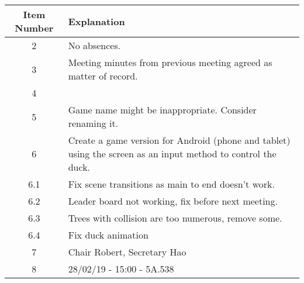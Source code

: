 \documentclass{article}
\begin{document}
\begin{table}[H]
	\centering
	\begin{tabular}{| c | p{9cm} |}
		\hline
		Item Number & Explanation \\ \hline
		2 & No absences.\\ \hline
		3 & Meeting minutes from previous meeting agreed as matter of record. \\ \hline
		4 & \\ \hline
		5 & Game name might be inappropriate. Consider renaming it.\\ \hline
		6 & Create a game version for Android (phone and tablet) using the screen as an input method to control the duck. \\ \hline
		6.1 & Fix scene transitions as main to end doesn't work. \\ \hline
		6.2 & Leader board not working, fix before next meeting. \\ \hline
		6.3 & Trees with collision are too numerous, remove some. \\ \hline
		6.4 & Fix duck animation \\ \hline
		7 & Chair Robert, Secretary Hao\\ \hline
		8 & 28/02/19 - 15:00 - 5A.538   \\ \hline
		
	\end{tabular}
\end{table}
\end{document}
